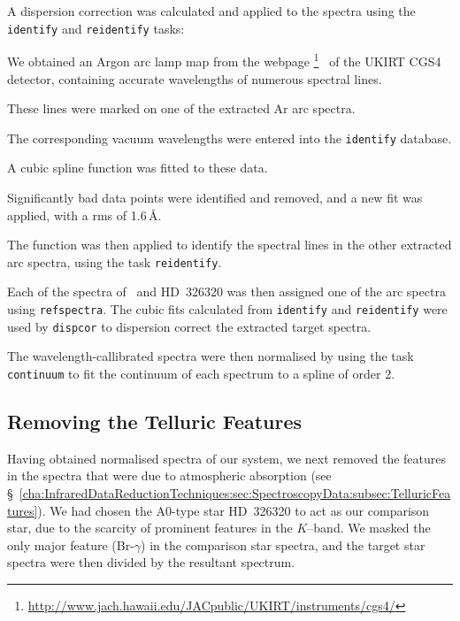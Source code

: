 \vspace{\myparskip}

A dispersion correction was calculated and applied to the spectra using the \texttt{identify} and \texttt{reidentify} tasks: %
\begin{inparaenum}[(i)]
\item
We obtained an Argon arc lamp map from the webpage%
\footnote{%
\label{cha:AccretionDiskContamination:sec:Spectroscopy:subsec:InitialReduction:foot:CGS4}
\url{http://www.jach.hawaii.edu/JACpublic/UKIRT/instruments/cgs4/} }%
\ of the UKIRT CGS4 detector, containing accurate wavelengths of
numerous spectral lines. 
\item
These lines were marked on one of the
extracted Ar arc spectra. 
\item
The corresponding vacuum wavelengths were
entered into the \texttt{identify} database. 
\item
A cubic spline function
was fitted to these data. 
\item
Significantly bad data points
were identified and removed, and a new fit was applied, with a rms of
1.6\,\AA.
\item The function was then applied to identify the spectral lines in the other
extracted arc spectra, using the task \texttt{reidentify}. %
\end{inparaenum}

\vspace{\myparskip}

Each of the spectra of \groj\ and \mbox{HD 326320}
was then assigned one of the arc spectra using
\texttt{refspectra}. The cubic fits calculated from \texttt{identify}
and \texttt{reidentify} were used by \texttt{dispcor} to dispersion
correct the extracted target spectra. %

\vspace{\myparskip}

The wavelength-callibrated spectra were then normalised by using the
task \texttt{continuum} to fit the continuum of each spectrum to a
spline of order 2. %


\subsection{Removing the Telluric Features}
\label{cha:AccretionDiskContamination:sec:Spectroscopy:subsec:TelluricFeatures}

Having obtained normalised spectra of our system, we next removed the features in the spectra that were due to atmospheric absorption (see \S~\ref{cha:InfraredDataReductionTechniques:sec:SpectroscopyData:subsec:TelluricFeatures}). We had chosen the A0-type star \mbox{HD 326320} to act as our comparison star, due to the scarcity of prominent features in the $K$--band. We masked the only major feature (Br-$\gamma$) in the comparison star spectra, and the target star spectra were then divided by the
resultant spectrum. %

